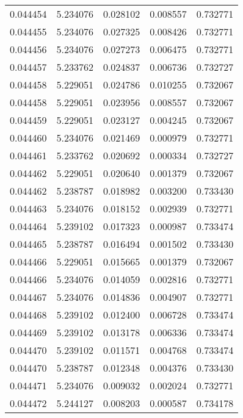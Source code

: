 \begin{tabular}{lrrrr}
0.044454    &  5.234076 &  0.028102 &  0.008557 &             0.732771 \\
0.044455    &  5.234076 &  0.027325 &  0.008426 &             0.732771 \\
0.044456    &  5.234076 &  0.027273 &  0.006475 &             0.732771 \\
0.044457    &  5.233762 &  0.024837 &  0.006736 &             0.732727 \\
0.044458    &  5.229051 &  0.024786 &  0.010255 &             0.732067 \\
0.044458    &  5.229051 &  0.023956 &  0.008557 &             0.732067 \\
0.044459    &  5.229051 &  0.023127 &  0.004245 &             0.732067 \\
0.044460    &  5.234076 &  0.021469 &  0.000979 &             0.732771 \\
0.044461    &  5.233762 &  0.020692 &  0.000334 &             0.732727 \\
0.044462    &  5.229051 &  0.020640 &  0.001379 &             0.732067 \\
0.044462    &  5.238787 &  0.018982 &  0.003200 &             0.733430 \\
0.044463    &  5.234076 &  0.018152 &  0.002939 &             0.732771 \\
0.044464    &  5.239102 &  0.017323 &  0.000987 &             0.733474 \\
0.044465    &  5.238787 &  0.016494 &  0.001502 &             0.733430 \\
0.044466    &  5.229051 &  0.015665 &  0.001379 &             0.732067 \\
0.044466    &  5.234076 &  0.014059 &  0.002816 &             0.732771 \\
0.044467    &  5.234076 &  0.014836 &  0.004907 &             0.732771 \\
0.044468    &  5.239102 &  0.012400 &  0.006728 &             0.733474 \\
0.044469    &  5.239102 &  0.013178 &  0.006336 &             0.733474 \\
0.044470    &  5.239102 &  0.011571 &  0.004768 &             0.733474 \\
0.044470    &  5.238787 &  0.012348 &  0.004376 &             0.733430 \\
0.044471    &  5.234076 &  0.009032 &  0.002024 &             0.732771 \\
0.044472    &  5.244127 &  0.008203 &  0.000587 &             0.734178 \\

\end{tabular}
